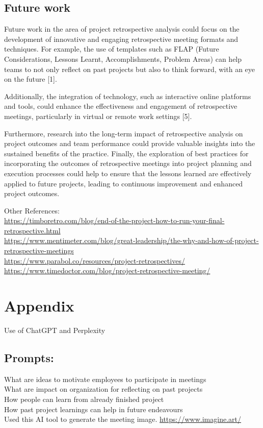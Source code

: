 \documentclass{article}
\begin{document}
\subsection{Future work}
Future work in the area of project retrospective analysis could focus on the development of innovative and engaging retrospective meeting formats and techniques. For example, the use of templates such as FLAP (Future Considerations, Lessons Learnt, Accomplishments, Problem Areas) can help teams to not only reflect on past projects but also to think forward, with an eye on the future [1]. 

Additionally, the integration of technology, such as interactive online platforms and tools, could enhance the effectiveness and engagement of retrospective meetings, particularly in virtual or remote work settings [5]. 

Furthermore, research into the long-term impact of retrospective analysis on project outcomes and team performance could provide valuable insights into the sustained benefits of the practice. Finally, the exploration of best practices for incorporating the outcomes of retrospective meetings into project planning and execution processes could help to ensure that the lessons learned are effectively applied to future projects, leading to continuous improvement and enhanced project outcomes.
\newpage



Other References: \\
\url{https://timboretro.com/blog/end-of-the-project-how-to-run-your-final-retrospective.html} \\
\url{https://www.mentimeter.com/blog/great-leadership/the-why-and-how-of-project-retrospective-meetings}\\
\url{https://www.parabol.co/resources/project-retrospectives/}\\
\url{https://www.timedoctor.com/blog/project-retrospective-meeting/}\\

\section{Appendix}
\noindent Use of ChatGPT and Perplexity
\subsection{Prompts:} 
\noindent What are ideas to motivate employees to participate in meetings \\
What are impact on organization for reflecting on past projects \\ 
How people can learn from already finished project \\ 
How past project learnings can help in future endeavours \\
Used this AI tool to generate the meeting image. \url{https://www.imagine.art/}
\end{document}
